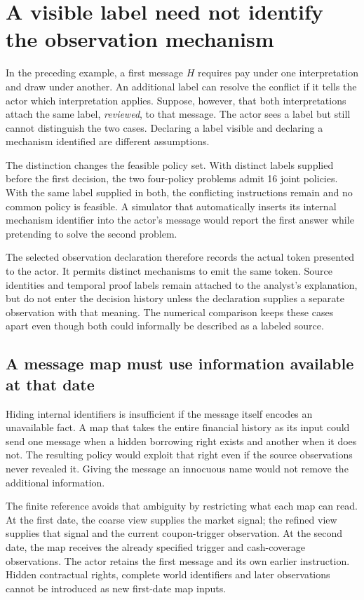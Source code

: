 \section{A visible label need not identify the observation mechanism}
\label{sim:bound-observation-map}

In the preceding example, a first message $H$ requires pay under one interpretation and draw under another. An additional label can resolve the conflict if it tells the actor which interpretation applies. Suppose, however, that both interpretations attach the same label, \emph{reviewed}, to that message. The actor sees a label but still cannot distinguish the two cases. Declaring a label visible and declaring a mechanism identified are different assumptions.

The distinction changes the feasible policy set. With distinct labels supplied before the first decision, the two four-policy problems admit 16 joint policies. With the same label supplied in both, the conflicting instructions remain and no common policy is feasible. A simulator that automatically inserts its internal mechanism identifier into the actor's message would report the first answer while pretending to solve the second problem.

The selected observation declaration therefore records the actual token presented to the actor. It permits distinct mechanisms to emit the same token. Source identities and temporal proof labels remain attached to the analyst's explanation, but do not enter the decision history unless the declaration supplies a separate observation with that meaning. The numerical comparison keeps these cases apart even though both could informally be described as a labeled source.

\subsection{A message map must use information available at that date}

Hiding internal identifiers is insufficient if the message itself encodes an unavailable fact. A map that takes the entire financial history as its input could send one message when a hidden borrowing right exists and another when it does not. The resulting policy would exploit that right even if the source observations never revealed it. Giving the message an innocuous name would not remove the additional information.

The finite reference avoids that ambiguity by restricting what each map can read. At the first date, the coarse view supplies the market signal; the refined view supplies that signal and the current coupon-trigger observation. At the second date, the map receives the already specified trigger and cash-coverage observations. The actor retains the first message and its own earlier instruction. Hidden contractual rights, complete world identifiers and later observations cannot be introduced as new first-date map inputs.

